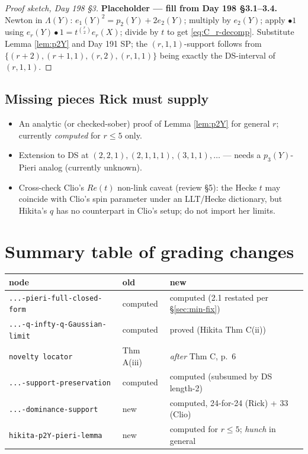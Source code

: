 \documentclass[11pt]{article}
\theoremstyle{definition}
\newcommand{\bul}{\bullet}
\begin{document}
\begin{proof}[Proof sketch, Day 198 \S3]
\textbf{Placeholder --- fill from Day 198 \S3.1--3.4.} Newton in
$\Lambda(Y)$: $e_1(Y)^2 = p_2(Y) + 2e_2(Y)$; multiply by $e_2(Y)$;
apply $\bul 1$ using $e_r(Y)\bul 1 = t^{\binom r2} e_r(X)$; divide by
$t$ to get \eqref{eq:C_r-decomp}. Substitute Lemma \ref{lem:p2Y} and
Day 191 SP; the $(r,1,1)$-support follows from
$\{(r+2),(r+1,1),(r,2),(r,1,1)\}$ being exactly the DS-interval of
$(r,1,1)$.
\end{proof}

\subsection*{Missing pieces Rick must supply}
\begin{itemize}[leftmargin=1.5em]
  \item An analytic (or checked-sober) proof of Lemma \ref{lem:p2Y}
        for general $r$; currently \emph{computed} for $r\le 5$ only.
  \item Extension to DS at $(2,2,1),(2,1,1,1),(3,1,1),\dots$ --- needs
        a $p_3(Y)$-Pieri analog (currently unknown).
  \item Cross-check Clio's $Re(t)$ non-link caveat (review \S5): the
        Hecke $t$ may coincide with Clio's spin parameter under an
        LLT/Hecke dictionary, but Hikita's $q$ has no counterpart in
        Clio's setup; do not import her limits.
\end{itemize}

\section*{Summary table of grading changes}
\begin{center}\small
\begin{tabular}{lll}
node & old & new \\ \hline
\verb|...-pieri-full-closed-form|   & computed & computed (2.1 restated per \S\ref{sec:min-fix}) \\
\verb|...-q-infty-q-Gaussian-limit| & computed & proved (Hikita Thm C(ii)) \\
\verb|novelty locator|              & Thm A(iii) & \emph{after} Thm C, p.~6 \\
\verb|...-support-preservation|     & computed & computed (subsumed by DS length-2) \\
\verb|...-dominance-support|        & new      & computed, 24-for-24 (Rick) + 33 (Clio) \\
\verb|hikita-p2Y-pieri-lemma|       & new      & computed for $r\le 5$; \emph{hunch} in general \\
\end{tabular}
\end{center}
\end{document}
